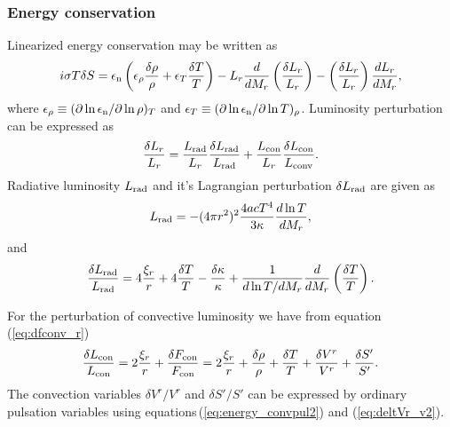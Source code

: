 \documentclass[fleqn,usenatbib]{mnras}
\begin{document}
\subsubsection{Energy conservation}
Linearized energy conservation may be written as
\begin{equation}
i\sigma T\delta S 
= \epsilon_{\rm n}\left(\epsilon_\rho{\delta\rho\over\rho}
+\epsilon_T{\delta T\over T}\right)
-L_r{d\over dM_r}\left(\delta L_r\over L_r\right) 
- \left(\delta L_r\over L_r\right){dL_r\over dM_r},
\end{equation}
where $\epsilon_\rho\equiv(\partial\ln\epsilon_{\rm n}/\partial\ln\rho)_T$ and
$\epsilon_T\equiv(\partial\ln\epsilon_{\rm n}/\partial\ln T)_\rho$.
%
Luminosity perturbation can be expressed as
\begin{equation}
{\delta L_r\over L_r} = {L_{\rm rad}\over L_r}{\delta L_{\rm rad}\over L_{\rm rad}} + {L_{\rm con}\over L_r}{\delta L_{\rm con}\over L_{\rm conv}}.
\end{equation}
Radiative luminosity $L_{\rm rad}$ and it's Lagrangian perturbation 
$\delta L_{\rm rad}$ are given as
\begin{equation}
L_{\rm rad} = -(4\pi r^2)^2{4acT^4\over 3\kappa}{d\ln T\over dM_r},
\end{equation}
and
\begin{equation}
{\delta L_{\rm rad}\over L_{\rm rad}}
=4{\xi_r\over r}+4{\delta T\over T} -{\delta\kappa\over\kappa} 
+ {1\over d\ln T/dM_r}{d\over dM_r}\left(\delta T\over T\right).
\end{equation}

For the perturbation of convective luminosity we have 
from equation\,(\ref{eq:dfconv_r})
\begin{equation}
{\delta L_{{\rm con}}\over L_{\rm con}} = 2{\xi_r\over r} + {\delta F_{{\rm con}}\over F_{\rm con}}
= 2{\xi_r\over r} + {\delta\rho\over\rho} + {\delta T\over T}
+ {\delta V^r\over V^r}+ {\delta S'\over S'}.
\label{eq:Lcon}
\end{equation}
The convection variables 
${\delta V^r/V^r}$ and ${\delta S'/S'}$
can be expressed by ordinary pulsation variables using
equations\,(\ref{eq:energy_convpul2}) and (\ref{eq:deltVr_v2}).
%
\end{document}
